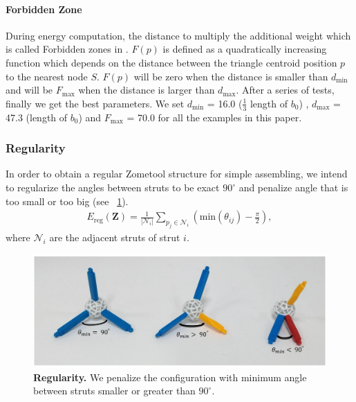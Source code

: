 \paragraph{Forbidden Zone}
During energy computation, the distance  to multiply the additional weight which is called Forbidden zones in \cite{zimmer:2014:Zometool}. 
$F(p)$ is defined as a quadratically increasing function which depends on the distance between the triangle centroid position $p$ to the nearest node $S$. $F(p)$ will be zero when the distance is smaller than $d_{\text{min}}$ and will be $F_{\text{max}}$ when the distance is larger than $d_{\text{max}}$. 
After a series of tests, finally\chinky{,} we get the best parameters. 
We set $d_{\text{min}}$ = 16.0 ($\frac{1}{3}$ length of $b_0$) , $d_{\text{max}}$ = 47.3 (length of $b_0$) and $F_{\text{max}}$ = 70.0 for all the examples in this paper. 


\subsubsection{Regularity}
In order to obtain a regular Zometool structure for simple assembling, we intend to regularize the angles between struts to be exact $90^\circ$ and penalize angle that is too small or too big (see \figname~\ref{fig:Regularity}).
\begin{align}
E_{\text{reg}}(\mathbf{Z}) = \frac{1}{|\mathcal{N}_i|} \sum_{p_j\in\mathcal{N}_i} (\text{min}(\theta_{ij})-\frac{\pi}{2}),
\end{align}
where $\mathcal{N}_i$ are the adjacent struts of strut $i$.

\begin{figure}[ht]
\centering
\includegraphics[width=1.0\linewidth]{figs/Regularity.pdf} 
\caption{\textbf{Regularity.} We penalize the configuration with minimum angle between struts smaller or greater than $90^\circ$.}
\label{fig:Regularity}
\end{figure}

